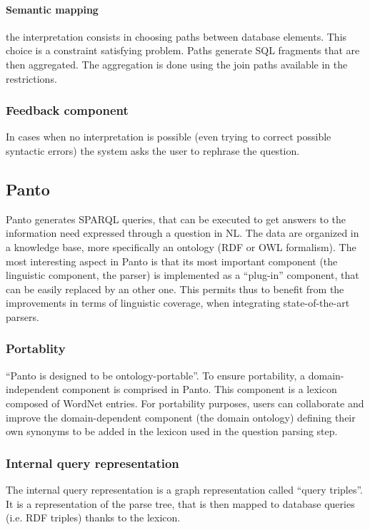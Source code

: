 \documentclass[10pt,journal,letterpaper,compsoc]{IEEEtran}
\begin{document}
\paragraph{Semantic mapping}
the interpretation consists in choosing paths
between database elements. This choice is a constraint satisfying problem.
Paths generate SQL fragments that are then
aggregated. The aggregation is done using the join paths available in the
restrictions.


\subsubsection{Feedback component}
In cases when no interpretation is possible (even trying to correct
possible syntactic errors) the system asks the user to rephrase the
question.


 
\subsection{{\sc Panto}~\cite{Wang:2007:PPN:1419662.1419706}}
{\sc Panto} generates SPARQL queries, that can be executed
to get answers to the information need expressed through a question in NL.
The data are organized in a knowledge base, more specifically
an ontology (RDF or OWL formalism).
The most interesting aspect in {\sc Panto} is that its most important component
(the linguistic component, the parser) is implemented as a ``plug-in''
component, that can be easily replaced by an other one. This permits thus to
benefit from the improvements in terms of linguistic coverage, when integrating
state-of-the-art parsers.  

\subsubsection{Portablity}
``{\sc Panto} is designed to be ontology-portable''. To
ensure portability, a domain-independent component is comprised in {\sc
Panto}. This component is a lexicon composed of WordNet entries. For
portability purposes, users can collaborate and improve the domain-dependent
component (the domain ontology) defining their own synonyms to be added in the
lexicon used in the question parsing step.

\subsubsection{Internal query representation}
The internal query representation is a graph representation called ``query
triples''. 
It is a representation of the parse tree, that is then mapped to database
queries (i.e. RDF triples) thanks to the lexicon.
\end{document}
